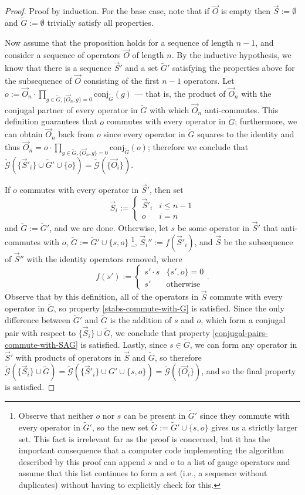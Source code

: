 \documentclass[12pt]{amsbook}
\theoremstyle{plain}
\theoremstyle{definition}
\theoremstyle{remark}
\newcommand{\lst}{\vec}
\newcommand{\set}{\tilde}
\newcommand{\genfun}{\tilde{\mathcal{G}}}
\newcommand{\paren}[1]{\left(#1\right)}
\begin{document}
\begin{proof}
Proof by induction.  For the base case, note that if $\lst O$ is empty then $\lst S:=\emptyset$ and $\set G:=\emptyset$ trivially satisfy all properties.

Now assume that the proposition holds for a sequence of length $n-1$, and consider a sequence of operators $\lst O$ of length $n$.  By the inductive hypothesis, we know that there is a sequence $\lst S'$ and a set $\set G'$ satisfying the properties above for the subsequence of $\lst O$ consisting of the first $n-1$ operators.  Let $o:=\lst O_n\cdot \prod_{g\in \set G, \{\lst O_n,g\}=0} \text{conj}_{\set G}(g)$ --- that is, the product of $\lst O_n$ with the conjugal partner of every operator in $\set G$ with which $\lst O_n$ anti-commutes.  This definition guarantees that $o$ commutes with every operator in $\set G$;  furthermore, we can obtain $\lst O_n$ back from $o$ since every operator in $\set G$ squares to the identity and thus $\lst O_n=o\cdot \prod_{g\in \set G, \{\lst O_n,g\}=0} \text{conj}_{\set G}(o)$; therefore we conclude that $\genfun\paren{\{\lst S'_i\} \cup \set G' \cup \{o\}}=\genfun\paren{\{\lst O_i\}}$.

If $o$ commutes with every operator in $\lst S'$, then set
$$\lst S_i :=
\begin{cases}
\lst S'_i & i \le n-1 \\
o & i = n
\end{cases}
$$
and $\set G := \set G'$, and we are done.  Otherwise, let $s$ be some operator in $\lst S'$ that anti-commutes with $o$, $\set G:=\set G'\cup \{s,o\}$
\footnote{Observe that neither $o$ nor $s$ can be present in $\set G'$ since they commute with every operator in $\set G'$, so the new set $\set G:=\set G'\cup \{s,o\}$ gives us a strictly larger set.  This fact is irrelevant far as the proof is concerned, but it has the important consequence that a computer code implementing the algorithm described by this proof can append $s$ and $o$ to a list of gauge operators and assume that this list continues to form a set (i.e., a sequence without duplicates) without having to explicitly check for this.}, $\lst S_i'' := f(\lst S'_i)$, and $\lst S$ be the subsequence of $\lst S''$ with the identity operators removed, where
$$
f(s') :=
\begin{cases}
s'\cdot s & \{s',o\}=0\\
s' & \text{otherwise}
\end{cases}.
$$
Observe that by this definition, all of the operators in $\lst S$ commute with every operator in $\set G$, so property \ref{stabs-commute-with-G} is satisfied.  Since the only difference between $\set G'$ and $\set G$ is the addition of $s$ and $o$, which form a conjugal pair with respect to $\{\lst S_i\} \cup \set G$, we conclude that property \ref{conjugal-pairs-commute-with-SAG} is satisfied.
Lastly, since $s\in \set G$, we can form any operator in $\lst S'$ with products of operators in $\lst S$ and $\set G$, so therefore $\genfun\paren{\{\lst S_i\} \cup \set G}=\genfun\paren{\{\lst S'_i\} \cup G' \cup \{s,o\}}=\genfun\paren{\{\lst O_i\}}$, and so the final property is satisfied.


\end{proof}
\end{document}
